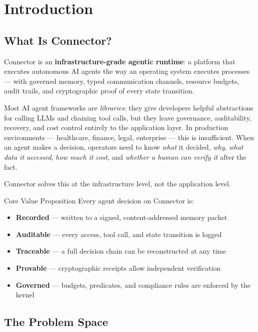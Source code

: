 \chapter{Introduction}

\section{What Is Connector?}

Connector is an \textbf{infrastructure-grade agentic runtime}: a platform that executes
autonomous AI agents the way an operating system executes processes — with governed
memory, typed communication channels, resource budgets, audit trails, and
cryptographic proof of every state transition.

Most AI agent frameworks are \emph{libraries}: they give developers helpful
abstractions for calling LLMs and chaining tool calls, but they leave
governance, auditability, recovery, and cost control entirely to the
application layer. In production environments — healthcare, finance, legal,
enterprise — this is insufficient. When an agent makes a decision, operators
need to know \emph{what} it decided, \emph{why}, \emph{what data it accessed},
\emph{how much it cost}, and \emph{whether a human can verify it} after the fact.

Connector solves this at the infrastructure level, not the application level.

\begin{conceptbox}{Core Value Proposition}
Every agent decision on Connector is:
\begin{itemize}[noitemsep]
  \item \textbf{Recorded} — written to a signed, content-addressed memory packet
  \item \textbf{Auditable} — every access, tool call, and state transition is logged
  \item \textbf{Traceable} — a full decision chain can be reconstructed at any time
  \item \textbf{Provable} — cryptographic receipts allow independent verification
  \item \textbf{Governed} — budgets, predicates, and compliance rules are enforced by the kernel
\end{itemize}
\end{conceptbox}

\section{The Problem Space}

